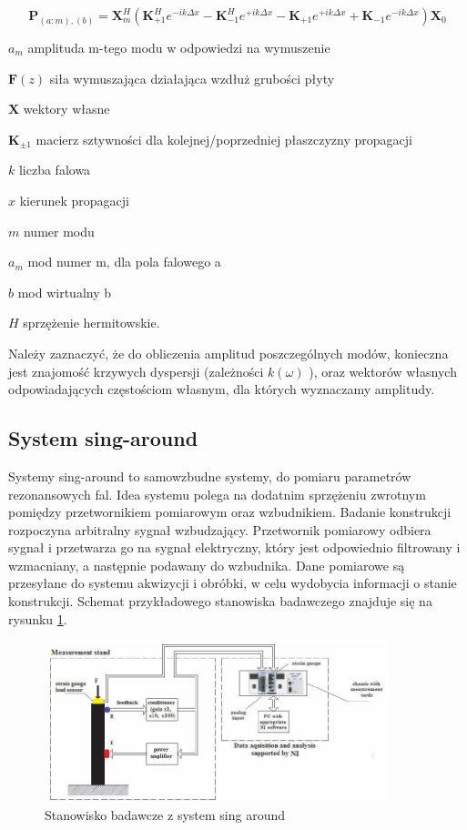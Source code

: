 \begin{equation} \label{eq:wzbudzanie3}
\textbf{P}_{(a:m),(b)} = \textbf{X}_m^{H} (\textbf{K}_{+1}^{H} e^{-ik\Delta x} - \textbf{K}_{-1}^{H} e^{+ik\Delta x} - \textbf{K}_{+1} e^{+ik\Delta x} + \textbf{K}_{-1} e^{-ik\Delta x})\textbf{X}_{0}
\end{equation}

\begin{eqwhere}[2cm]
	\item[$a_m$] amplituda m-tego modu w odpowiedzi na wymuszenie
	\item[$\textbf{F}(z)$] siła wymuszająca działająca wzdłuż grubości płyty
	\item[$\textbf{X}$] wektory własne 
	\item[$\textbf{K}_{\pm 1}$] macierz sztywności dla kolejnej/poprzedniej płaszczyzny propagacji
	\item[$k$] liczba falowa
	\item[$x$] kierunek propagacji
	\item[$m$] numer modu	
	\item[$a_m$] mod numer m, dla pola falowego a
	\item[$b$] mod wirtualny b	
	\item[$H$] sprzężenie hermitowskie.
\end{eqwhere}

Należy zaznaczyć, że do obliczenia amplitud poszczególnych modów, konieczna jest znajomość krzywych dyspersji (zależności \( k(\omega) \) ), oraz wektorów własnych odpowiadających częstościom własnym, dla których wyznaczamy amplitudy.

\subsection{System sing-around}

Systemy sing-around to samowzbudne systemy, do pomiaru parametrów rezonansowych fal. Idea systemu polega na dodatnim sprzężeniu zwrotnym pomiędzy przetwornikiem pomiarowym oraz wzbudnikiem. Badanie konstrukcji rozpoczyna arbitralny sygnał wzbudzający. Przetwornik pomiarowy odbiera sygnał i przetwarza go na sygnał elektryczny, który jest odpowiednio filtrowany i wzmacniany, a następnie podawany do wzbudnika. Dane pomiarowe są przesyłane do systemu akwizycji i obróbki, w celu wydobycia informacji o stanie konstrukcji. Schemat przykładowego stanowiska badawczego znajduje się na rysunku \ref{fig:sing_around}.

\begin{figure}[h]
\centering
\includegraphics[width=10cm]{Zdjecia/2/sing_around}
\caption{Stanowisko badawcze z system sing around}
\label{fig:sing_around}
\end{figure}

